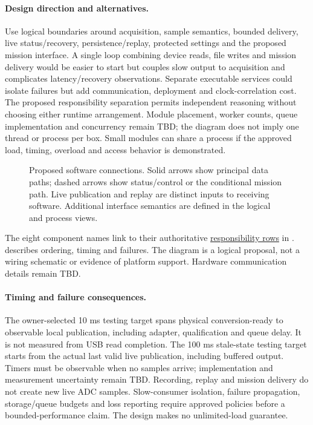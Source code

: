 \paragraph{Design direction and alternatives.}
Use logical boundaries around acquisition, sample semantics, bounded delivery,
live status/recovery, persistence/replay, protected settings and the proposed
mission interface. A single loop combining device reads, file writes and
mission delivery would be easier to start but couples slow output to acquisition
and complicates latency/recovery observations. Separate executable services
could isolate failures but add communication, deployment and clock-correlation
cost. The proposed responsibility separation permits independent reasoning
without choosing either runtime arrangement. Module placement, worker counts,
queue implementation and concurrency remain TBD; the diagram does not imply
one thread or process per box. Small modules can share a process if the approved
load, timing, overload and access behavior is demonstrated.

\begin{landscape}
\begin{figure}[p]
\centering

\caption{Proposed software connections. Solid arrows show principal data paths;
dashed arrows show status/control or the conditional mission path. Live publication
and replay are distinct inputs to receiving software. Additional interface semantics
are defined in the logical and process views.}
\label{Figure:SoftwareComponents}
\end{figure}
\end{landscape}

The eight component names link to their authoritative
\hyperref[Table:SoftwareResponsibilities]{responsibility rows} in
.  describes ordering, timing
and failures. The diagram is a logical proposal, not a wiring schematic or
evidence of platform support. Hardware communication details remain TBD.

\paragraph{Timing and failure consequences.}
The owner-selected 10 ms testing target spans physical conversion-ready to
observable local publication, including adapter, qualification and queue delay.
It is not measured from USB read completion. The 100 ms stale-state testing
target starts from the actual last valid live publication, including buffered
output. Timers must be observable when no samples arrive; implementation and
measurement uncertainty remain TBD. Recording, replay and mission delivery do
not create new live ADC samples. Slow-consumer isolation, failure propagation,
storage/queue budgets and loss reporting require approved policies before a
bounded-performance claim. The design makes no unlimited-load guarantee.

